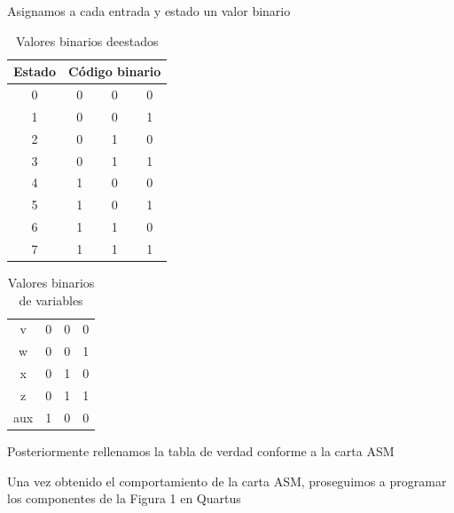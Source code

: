 \documentclass[table]{scrartcl}
\begin{document}
Asignamos a cada entrada y estado un valor binario
\begin{table}[H]
  \centering
  \caption{Valores binarios deestados}
\begin{tabular}{|c|ccc|}
\hline
\multicolumn{1}{|l|}{Estado} & \multicolumn{3}{l|}{Código binario} \\ \hline
\rowcolor[HTML]{FFE599}
0 & \multicolumn{1}{c|}{\cellcolor[HTML]{FFE599}0} & \multicolumn{1}{c|}{\cellcolor[HTML]{FFE599}0} & 0 \\ \hline
\rowcolor[HTML]{B6D7A8}
1 & \multicolumn{1}{c|}{\cellcolor[HTML]{B6D7A8}0} & \multicolumn{1}{c|}{\cellcolor[HTML]{B6D7A8}0} & 1 \\ \hline
\rowcolor[HTML]{A2C4C9}
2 & \multicolumn{1}{c|}{\cellcolor[HTML]{A2C4C9}0} & \multicolumn{1}{c|}{\cellcolor[HTML]{A2C4C9}1} & 0 \\ \hline
\rowcolor[HTML]{A4C2F4}
3 & \multicolumn{1}{c|}{\cellcolor[HTML]{A4C2F4}0} & \multicolumn{1}{c|}{\cellcolor[HTML]{A4C2F4}1} & 1 \\ \hline
\rowcolor[HTML]{9FC5E8}
4 & \multicolumn{1}{c|}{\cellcolor[HTML]{9FC5E8}1} & \multicolumn{1}{c|}{\cellcolor[HTML]{9FC5E8}0} & 0 \\ \hline
\rowcolor[HTML]{B4A7D6}
5 & \multicolumn{1}{c|}{\cellcolor[HTML]{B4A7D6}1} & \multicolumn{1}{c|}{\cellcolor[HTML]{B4A7D6}0} & 1 \\ \hline
\rowcolor[HTML]{D5A6BD}
6 & \multicolumn{1}{c|}{\cellcolor[HTML]{D5A6BD}1} & \multicolumn{1}{c|}{\cellcolor[HTML]{D5A6BD}1} & 0 \\ \hline
\rowcolor[HTML]{D9D2E9}
7 & \multicolumn{1}{c|}{\cellcolor[HTML]{D9D2E9}1} & \multicolumn{1}{c|}{\cellcolor[HTML]{D9D2E9}1} & 1 \\ \hline
\end{tabular}
\end{table}
\begin{table}[H]
  \centering
\caption{Valores binarios de variables}
\begin{tabular}{cccc}
\rowcolor[HTML]{E6B8AF}
v & 0 & 0 & 0 \\
\rowcolor[HTML]{F4CCCC}
w & 0 & 0 & 1 \\
\rowcolor[HTML]{FCE5CD}
x & 0 & 1 & 0 \\
\rowcolor[HTML]{FFF2CC}
z & 0 & 1 & 1 \\
\rowcolor[HTML]{D9EAD3}
aux & 1 & 0 & 0
\end{tabular}
\end{table}
Posteriormente rellenamos la tabla de verdad conforme a la carta ASM
\begin{center}
  
\end{center}
Una vez obtenido el comportamiento de la carta ASM, proseguimos a programar los
componentes de la Figura 1 en Quartus
\end{document}
